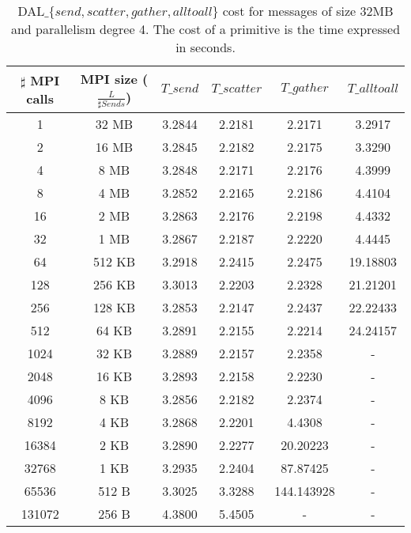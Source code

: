 \begin{table}[h]
\begin{center}
\begin{tabular}{|c|c|c|c|c|c|}\hline
\hline
$\sharp$ MPI calls & MPI size ($\frac{L}{\sharp Sends}$)  & $T\_send$   & $T\_scatter$  & $T\_gather$ & $T\_alltoall$      \\\hline\hline
1 & 32 MB & 3.2844 & 2.2181 & 2.2171 & 3.2917  \\\hline
2 & 16 MB & 3.2845 & 2.2182 & 2.2175 & 3.3290  \\\hline
4 & 8 MB & 3.2848 & 2.2171 & 2.2176 & 4.3999 \\\hline
8 & 4 MB & 3.2852 & 2.2165 & 2.2186 & 4.4104 \\\hline
16 & 2 MB & 3.2863 & 2.2176 & 2.2198 & 4.4332 \\\hline
32 & 1 MB & 3.2867 & 2.2187 & 2.2220 & 4.4445 \\\hline
64 & 512 KB & 3.2918 & 2.2415 & 2.2475 & 19.18803 \\\hline
128 & 256 KB & 3.3013 & 2.2203 & 2.2328 & 21.21201 \\\hline
256 & 128 KB & 3.2853 & 2.2147 & 2.2437 & 22.22433 \\\hline
512 & 64 KB & 3.2891 & 2.2155 & 2.2214 & 24.24157 \\\hline
1024 & 32 KB & 3.2889 & 2.2157 & 2.2358 & - \\\hline
2048 & 16 KB & 3.2893 & 2.2158 & 2.2230 & - \\\hline
4096 & 8 KB & 3.2856 & 2.2182 & 2.2374 & - \\\hline
8192 & 4 KB & 3.2868 & 2.2201 & 4.4308 & - \\\hline
16384 & 2 KB & 3.2890 & 2.2277 & 20.20223 & - \\\hline
32768 & 1 KB & 3.2935 & 2.2404 & 87.87425 & - \\\hline
65536 & 512 B & 3.3025 & 3.3288 & 144.143928 & - \\\hline
131072 & 256 B & 4.3800 & 5.4505 & - & - \\\hline
\end{tabular}
\caption{DAL$\_\lbrace send, scatter, gather, alltoall \rbrace$ cost for messages of size 32MB and parallelism degree 4. The cost of a primitive is the time expressed in seconds. }
\label{tsetup-pianosa-n4-M32}
\end{center}
\end{table}


